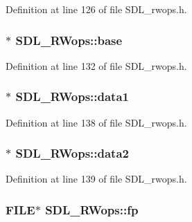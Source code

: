Definition at line 126 of file S\-D\-L\-\_\-rwops.\-h.

\hypertarget{struct_s_d_l___r_wops_af9b489d7342296ce197b911cfa93b2ab}{
\subsubsection[{base}]{$\ast$ S\-D\-L\-\_\-\-R\-Wops\-::base}}\label{struct_s_d_l___r_wops_af9b489d7342296ce197b911cfa93b2ab}


Definition at line 132 of file S\-D\-L\-\_\-rwops.\-h.

\hypertarget{struct_s_d_l___r_wops_ab89d27b4312c0b9d664c81bc92917fc8}{
\subsubsection[{data1}]{$\ast$ S\-D\-L\-\_\-\-R\-Wops\-::data1}}\label{struct_s_d_l___r_wops_ab89d27b4312c0b9d664c81bc92917fc8}


Definition at line 138 of file S\-D\-L\-\_\-rwops.\-h.

\hypertarget{struct_s_d_l___r_wops_aca073130e2e262eb11e86e1be993e215}{
\subsubsection[{data2}]{$\ast$ S\-D\-L\-\_\-\-R\-Wops\-::data2}}\label{struct_s_d_l___r_wops_aca073130e2e262eb11e86e1be993e215}


Definition at line 139 of file S\-D\-L\-\_\-rwops.\-h.

\hypertarget{struct_s_d_l___r_wops_a1fd8d69542725cd065f8be2398d287fe}{
\subsubsection[{fp}]{\setlength{\rightskip}{0pt plus 5cm}F\-I\-L\-E$\ast$ S\-D\-L\-\_\-\-R\-Wops\-::fp}}\label{struct_s_d_l___r_wops_a1fd8d69542725cd065f8be2398d287fe}



